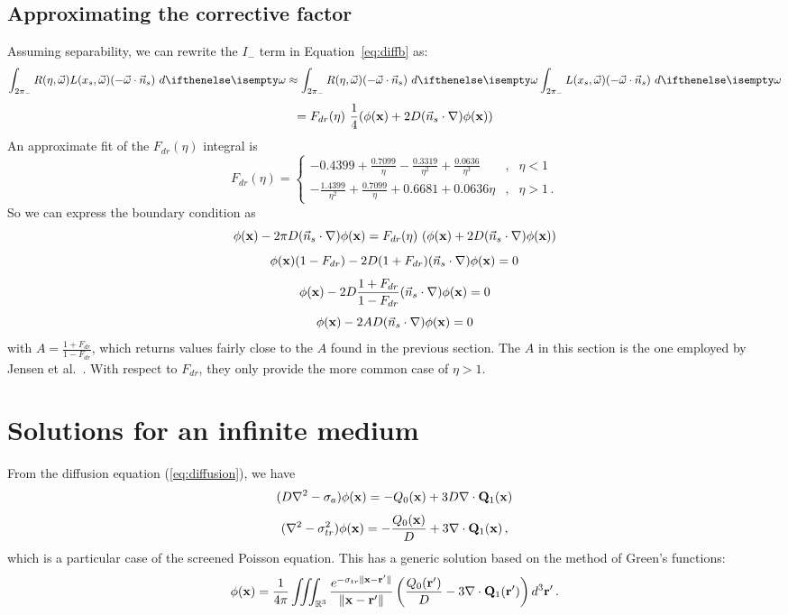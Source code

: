 \documentclass[10pt,a4paper]{article}
\begin{document}
\subsection{Approximating the corrective factor}

Assuming separability, we can rewrite the $I_-$ term in Equation~\ref{eq:diffb} as:
$$
 \lowerhemisphere{R(\eta, \omegavec) L(x_s, \omegavec) (-\omegavec \cdot \vec{n}_s)}{} \approx \lowerhemisphere{R(\eta, \omegavec)  (-\omegavec \cdot \vec{n}_s)}{} \lowerhemisphere{L(x_s, \omegavec) (-\omegavec \cdot \vec{n}_s)}{}
$$
$$
= F_{dr}(\eta)\  \frac{1}{4}({\phi}(\mathbf{x}) + 2 D (\vec{n}_s \cdot {\nabla}) {\phi}(\mathbf{x}))
$$
An approximate fit of the $F_{dr}(\eta)$ integral is~\cite{egan73}
$$
F_{dr}(\eta) = \left\{\begin{array}{ccl} \displaystyle -0.4399 + \frac{0.7099}{\eta} - \frac{0.3319}{\eta^2} + \frac{0.0636}{\eta^3} & , & \eta < 1 \\[2ex]
\displaystyle -\frac{1.4399}{\eta^2} +\frac{0.7099}{\eta} + 0.6681 + 0.0636 \eta & , & \eta > 1 \, .\end{array}\right.
$$
So we can express the boundary condition as
$$
{\phi}(\mathbf{x}) - 2 \pi D (\vec{n}_s \cdot {\nabla}) {\phi}(\mathbf{x}) = F_{dr}(\eta)\ ({\phi}(\mathbf{x}) + 2 D (\vec{n}_s \cdot {\nabla}) {\phi}(\mathbf{x}))
$$
$$
{\phi}(\mathbf{x}) (1 - F_{dr}) - 2 D (1 + F_{dr}) (\vec{n}_s \cdot {\nabla}) {\phi}(\mathbf{x}) = 0
$$
$$
{\phi}(\mathbf{x}) - 2 D \frac{1 + F_{dr}}{1 - F_{dr}} (\vec{n}_s \cdot {\nabla}) {\phi}(\mathbf{x}) = 0
$$
$$
{\phi}(\mathbf{x}) - 2 A D (\vec{n}_s \cdot {\nabla}) {\phi}(\mathbf{x}) = 0
$$
with $A = \frac{1 + F_{dr}}{1 - F_{dr}}$, which returns values fairly close to the $A$ found in the previous section. The $A$ in this section is the one employed by Jensen et al.~\cite{jensen01}. With respect to $F_{dr}$, they only provide the more common case of $\eta > 1$.

\section{Solutions for an infinite medium}
From the diffusion equation (\ref{eq:diffusion}), we have
$$
(D \nabla^2 - \sigma_a) {\phi}(\mathbf{x}) =  -{Q_0}(\mathbf{x}) + 3 D {\nabla} \cdot \mathbf{Q}_1(\mathbf{x})
$$
$$
(\nabla^2 - \sigma_{tr}^2) {\phi}(\mathbf{x}) =  -  \frac{{Q_0}(\mathbf{x})}{D} + 3 {\nabla} \cdot \mathbf{Q}_1(\mathbf{x}) \, ,
$$
which is a particular case of the screened Poisson equation. This has a generic solution based on the method of Green's functions:
$$
{\phi}(\mathbf{x}) = \frac{1}{4 \pi} \iiint_{\mathbb{R}^3} \frac{e^{-\sigma_{tr} \|\mathbf{x} - \mathbf{r}' \|}}{\|\mathbf{x} - \mathbf{r}' \|} \left(  \frac{{Q_0}(\mathbf{r'})}{D} - 3 {\nabla} \cdot \mathbf{Q}_1(\mathbf{r'})\right) d^3 \mathbf{r}' \, .
\label{eq:poisson}
$$
\end{document}
